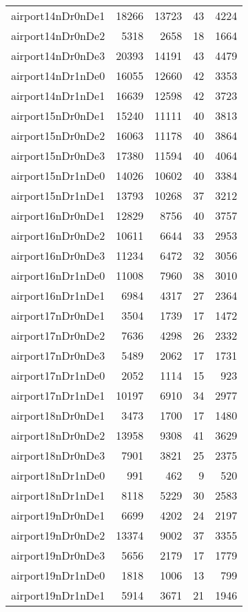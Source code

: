 \begin{longtable}{lrrrr}
airport14nDr0nDe1 & 18266 & 13723 & 43 & 4224 \\
airport14nDr0nDe2 & 5318 & 2658 & 18 & 1664 \\
airport14nDr0nDe3 & 20393 & 14191 & 43 & 4479 \\
airport14nDr1nDe0 & 16055 & 12660 & 42 & 3353 \\
airport14nDr1nDe1 & 16639 & 12598 & 42 & 3723 \\
airport15nDr0nDe1 & 15240 & 11111 & 40 & 3813 \\
airport15nDr0nDe2 & 16063 & 11178 & 40 & 3864 \\
airport15nDr0nDe3 & 17380 & 11594 & 40 & 4064 \\
airport15nDr1nDe0 & 14026 & 10602 & 40 & 3384 \\
airport15nDr1nDe1 & 13793 & 10268 & 37 & 3212 \\
airport16nDr0nDe1 & 12829 & 8756 & 40 & 3757 \\
airport16nDr0nDe2 & 10611 & 6644 & 33 & 2953 \\
airport16nDr0nDe3 & 11234 & 6472 & 32 & 3056 \\
airport16nDr1nDe0 & 11008 & 7960 & 38 & 3010 \\
airport16nDr1nDe1 & 6984 & 4317 & 27 & 2364 \\
airport17nDr0nDe1 & 3504 & 1739 & 17 & 1472 \\
airport17nDr0nDe2 & 7636 & 4298 & 26 & 2332 \\
airport17nDr0nDe3 & 5489 & 2062 & 17 & 1731 \\
airport17nDr1nDe0 & 2052 & 1114 & 15 & 923 \\
airport17nDr1nDe1 & 10197 & 6910 & 34 & 2977 \\
airport18nDr0nDe1 & 3473 & 1700 & 17 & 1480 \\
airport18nDr0nDe2 & 13958 & 9308 & 41 & 3629 \\
airport18nDr0nDe3 & 7901 & 3821 & 25 & 2375 \\
airport18nDr1nDe0 & 991 & 462 & 9 & 520 \\
airport18nDr1nDe1 & 8118 & 5229 & 30 & 2583 \\
airport19nDr0nDe1 & 6699 & 4202 & 24 & 2197 \\
airport19nDr0nDe2 & 13374 & 9002 & 37 & 3355 \\
airport19nDr0nDe3 & 5656 & 2179 & 17 & 1779 \\
airport19nDr1nDe0 & 1818 & 1006 & 13 & 799 \\
airport19nDr1nDe1 & 5914 & 3671 & 21 & 1946 \\

\end{longtable}
